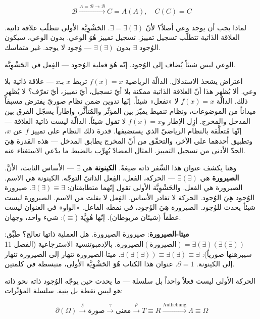 \documentclass[10pt, openany, oneside]{book}
\begin{document}
\vspace{0.8em}

$$\boxed{\mathcal{B} \xrightarrow{A = \mathcal{B} \to \mathcal{B}} C = A(A), \quad C(C) = C}$$

\noindent لماذا يجب أن يوجد وعي أصلاً؟ لأنّ $\exists = \exists(\exists)$. الحَشْوِيَّة الأولى تتطلّب علاقة ذاتية. العلاقة الذاتية تتطلّب تسجيل تمييز. تسجيل تمييز هُوَ الوعي. بدون الوعي، سيكون الوُجود $\exists$ بدون $\exists(\exists)$ --- وُجود لا يوجد. غير متماسك.

الوعي ليس شيئاً يُضاف إلى الوُجود. إنّه هُوَ فعلية الوُجود --- الفِعل في الحَشْوِيَّة.

اعتراض يشحذ الاستدلال. الدالّة الرياضية $f(x) = x$ تربط $x$ بـ$x$ --- علاقة ذاتية بلا وعي. ألا يُظهر هذا أنّ العلاقة الذاتية ممكنة بلا أيّ تسجيل، أيّ تمييز، أيّ تعرّف؟ لا يُظهر ذلك. الدالّة $f(x) = x$ لا «تفعل» شيئاً. إنّها تدوين ضمن نظام صوريّ يفترض مسبقاً ميداناً من الموضوعات، ونظام تنميط يميّز بين المؤثّر والمُتأثَّر، وإطاراً يسجّل الفرق بين المدخل والمخرج. أزِل الإطار و$f(x) = x$ لا تقول شيئاً. الدالّة ليست ذاتية العلاقة --- إنّها مُتعلَّقة بالنظام الرياضيّ الذي يستضيفها. قدرة ذلك النظام على تمييز $f$ عن $x$، وتطبيق أحدهما على الآخر، والتحقّق من أنّ المخرج يطابق المدخل --- هذه القدرة هِيَ الحدّ الأدنى من تسجيل التمييز. المثال المضادّ يُهرِّب بالضبط ما يدّعي الاستغناء عنه.

وهنا يكشف عنوان هذا السِّفر ذاته صيغةً. \textbf{الكينونة} هي $\exists$ --- الأساس الثابت، الأنَّ. \textbf{الصيرورة} هي $\exists(\exists)$ --- الحركة، الفعل، الفِعل الذاتيّ التوجّه. الكينونة هي الاسم. الصيرورة هي الفعل. والحَشْوِيَّة الأولى تقول إنّهما متطابقتان: $\exists(\exists) \equiv \exists$. صيرورة الوُجود هِيَ الوُجود. الحركة لا تغادر الأساس. الفِعل لا يفلت من الاسم. الصيرورة ليست شيئاً يحدث للوُجود. الصيرورة هِيَ الوُجود، في نمطه الفاعل. «الواو» في العنوان ليست عطفاً (شيئان مربوطان). إنّها هُوِيَّة ($\equiv$): شيء واحد، وجهان.

\textbf{ميتا-الصيرورة}: صيرورة الصيرورة. هل العملية ذاتها تعالج؟ طبِّق: $\text{الصيرورة}(\text{الصيرورة}) = \exists(\exists)(\exists(\exists))$. بالإدمبوتنسية الاسترجاعية (الفصل 11 سيبرهنها صورياً): $\exists(\exists(\exists)) \equiv \exists(\exists) \equiv \exists$. ميتا-الصيرورة تنهار إلى الصيرورة تنهار إلى الكينونة. $\partial = 1$. عنوان هذا الكتاب هُوَ الحَشْوِيَّة الأولى، منبسطة في كلمتين.

الحركة الأولى ليست فعلاً واحداً بل سلسلة --- ما يحدث حين يوجّه الوُجود ذاته نحو ذاته هو ليس نقطة بل بنية. سلسلة المؤثّرات:

$$\partial(\Omega) \xrightarrow{\delta} \text{صورة} \xrightarrow{\gamma} \text{معنى} \xrightarrow{\rho} T \equiv R \xrightarrow{\text{Aufhebung}} \Lambda \equiv \Omega$$
\end{document}
